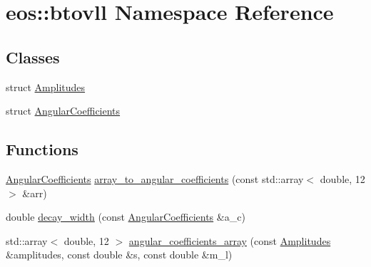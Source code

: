 \hypertarget{namespaceeos_1_1btovll}{
\section{eos::btovll Namespace Reference}
\label{namespaceeos_1_1btovll}
}
\subsection*{Classes}
\begin{DoxyCompactItemize}
\item 
struct \hyperlink{structeos_1_1btovll_1_1Amplitudes}{Amplitudes}
\item 
struct \hyperlink{structeos_1_1btovll_1_1AngularCoefficients}{AngularCoefficients}
\end{DoxyCompactItemize}
\subsection*{Functions}
\begin{DoxyCompactItemize}
\item 
\hyperlink{structeos_1_1btovll_1_1AngularCoefficients}{AngularCoefficients} \hyperlink{namespaceeos_1_1btovll_af4a61503514b02cdc2239f33915ac237}{array\_\-to\_\-angular\_\-coefficients} (const std::array$<$ double, 12 $>$ \&arr)
\item 
double \hyperlink{namespaceeos_1_1btovll_a7cdeae9d6d5f6d7b7df686f4ec9358c0}{decay\_\-width} (const \hyperlink{structeos_1_1btovll_1_1AngularCoefficients}{AngularCoefficients} \&a\_\-c)
\item 
std::array$<$ double, 12 $>$ \hyperlink{namespaceeos_1_1btovll_ab3d297e4fc263252e595a1447427afd9}{angular\_\-coefficients\_\-array} (const \hyperlink{structeos_1_1btovll_1_1Amplitudes}{Amplitudes} \&amplitudes, const double \&s, const double \&m\_\-l)
\end{DoxyCompactItemize}


